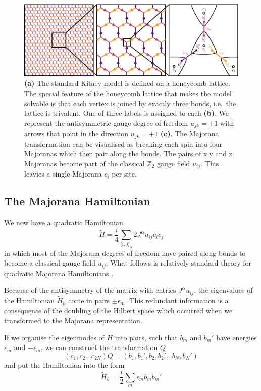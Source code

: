 \begin{figure}
\hypertarget{fig:intro_figure_by_hand}{%
\centering
\includegraphics[width=1\textwidth,height=\textheight]{figure_code/amk_chapter/intro/honeycomb_zoom/intro_figure_by_hand.pdf}
\caption{\textbf{(a)} The standard Kitaev model is defined on a honeycomb lattice. The special feature of the honeycomb lattice that makes the model solvable is that each vertex is joined by exactly three bonds, i.e.~the lattice is trivalent. One of three labels is assigned to each \textbf{(b)}. We represent the antisymmetric gauge degree of freedom \(u_{jk} = \pm 1\) with arrows that point in the direction \(u_{jk} = +1\) \textbf{(c)}. The Majorana transformation can be visualised as breaking each spin into four Majoranas which then pair along the bonds. The pairs of x,y and z Majoranas become part of the classical \(\mathbb{Z}_2\) gauge field \(u_{ij}\). This leavies a single Majorana \(c_i\) per site.}\label{fig:intro_figure_by_hand}
}
\end{figure}

\hypertarget{the-majorana-hamiltonian}{%
\subsection{The Majorana Hamiltonian}\label{the-majorana-hamiltonian}}

We now have a quadratic Hamiltonian \[ \tilde{H} =  \frac{i}{4} \sum_{\langle i,j\rangle_\alpha} 2J^{\alpha} u_{ij} c_i c_j\] in which most of the Majorana degrees of freedom have paired along bonds to become a classical gauge field \(u_{ij}\). What follows is relatively standard theory for quadratic Majorana Hamiltonians \textcite{BlaizotRipka1986}.

Because of the antisymmetry of the matrix with entries \(J^{\alpha} u_{ij}\), the eigenvalues of the Hamiltonian \(\tilde{H}_u\) come in pairs \(\pm \epsilon_m\). This redundant information is a consequence of the doubling of the Hilbert space which occurred when we transformed to the Majorana representation.

If we organise the eigenmodes of \(H\) into pairs, such that \(b_m\) and \(b_m'\) have energies \(\epsilon_m\) and \(-\epsilon_m\), we can construct the transformation \(Q\) \[(c_1, c_2... c_{2N}) Q = (b_1, b_1', b_2, b_2' ... b_{N}, b_{N}')\] and put the Hamiltonian into the form \[\tilde{H}_u = \frac{i}{2} \sum_m \epsilon_m b_m b_m'\]

